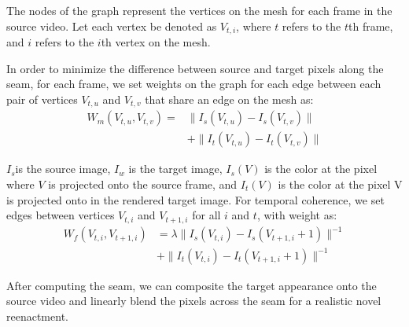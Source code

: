 The nodes of the graph represent the vertices on the mesh for each frame in the source video. 
Let each vertex be denoted as $V_{t,i}$, where $t$ refers to the $t$th frame, and $i$ refers to the $i$th vertex on the mesh. 

In order to minimize the difference between source and target pixels along the seam, for each frame, we set weights on the graph for each edge between each pair of vertices $V_{t,u}$ and  $V_{t,v}$ that share an edge on the mesh as:
\begin{equation}
\begin{split}
W_m(V_{t,u}, V_{t,v}) = & \|I_{s}(V_{t,u})-I_{s}(V_{t,v})\|\\
& + \|I_{t}(V_{t,u})-I_{t}(V_{t, v})\| 
\end{split}
\end{equation}

 $I_{s}$is the source image, $I_{w}$ is the target image, $I_{s}(V)$ is the color at the pixel where $V$ is projected onto the source frame, and $I_{t}(V)$ is the color at the pixel V is projected onto in the rendered target image.
 For temporal coherence, we set edges between vertices $V_{t,i}$ and $V_{t+1,i}$ for all $i$ and $t$, with weight as:
\begin{equation}
\begin{split}
W_f(V_{t,i}, V_{t+1,i})& = \lambda \|I_{s}(V_{t,i})-I_{s}(V_{t+1,i} +1)\|^{-1}\\
              & + \|I_{t}(V_{t,i})-I_{t}(V_{t+1,i} + 1)\|^{-1}
\end{split}
\end{equation}

After computing the seam, we can composite the target appearance onto the source video and linearly blend the pixels across the seam for a realistic novel reenactment.  





